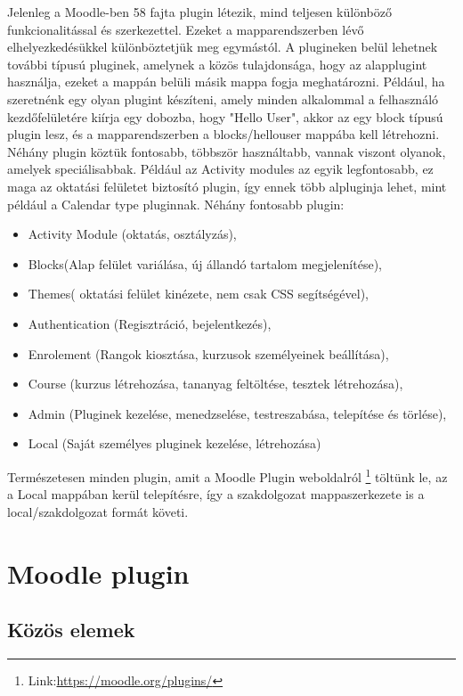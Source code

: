 Jelenleg a Moodle-ben 58 fajta plugin létezik, mind teljesen különböző funkcionalitással és szerkezettel. Ezeket a mapparendszerben lévő elhelyezkedésükkel különböztetjük meg egymástól. A plugineken belül lehetnek további típusú pluginek, amelynek a közös tulajdonsága, hogy az alapplugint használja, ezeket a mappán belüli másik mappa fogja meghatározni. Például, ha szeretnénk egy olyan plugint készíteni, amely minden alkalommal a felhasználó kezdőfelületére kiírja egy dobozba, hogy "Hello User", akkor az egy block típusú plugin lesz, és a mapparendszerben a blocks/hellouser mappába kell létrehozni. Néhány plugin köztük fontosabb, többször használtabb, vannak viszont olyanok, amelyek speciálisabbak. Például az Activity modules az egyik legfontosabb, ez maga az oktatási felületet biztosító plugin, így ennek több alpluginja lehet, mint például a Calendar type pluginnak. Néhány fontosabb plugin: 
\begin{itemize}
    \item Activity Module (oktatás, osztályzás), 
    \item Blocks(Alap felület variálása, új állandó tartalom megjelenítése), 
    \item Themes( oktatási felület kinézete, nem csak CSS segítségével), 
    \item Authentication (Regisztráció, bejelentkezés), 
    \item Enrolement (Rangok kiosztása, kurzusok személyeinek beállítása), 
    \item Course (kurzus létrehozása, tananyag feltöltése, tesztek létrehozása), 
    \item Admin (Pluginek kezelése, menedzselése, testreszabása, telepítése és törlése), 
    \item Local (Saját személyes pluginek kezelése, létrehozása) 
\end{itemize}

Természetesen minden plugin, amit a Moodle Plugin weboldalról \footnote{Link:\href{https://moodle.org/plugins/}{https://moodle.org/plugins/}} töltünk le, az a Local mappában kerül telepítésre, így a szakdolgozat mappaszerkezete is a local/szakdolgozat formát követi.

\section{Moodle plugin}

\subsection{Közös elemek}

